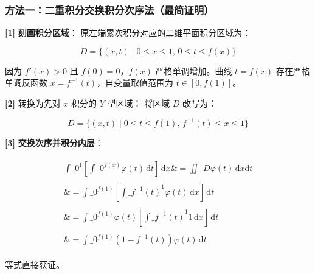 \documentclass[11pt,a4paper,UTF8]{ctexart}
\begin{document}
\subsubsection{方法一：二重积分交换积分次序法（最简证明）}
\begin{solbox}[分步推导与答题规范]
\textbf{[1]}  \textbf{刻画积分区域}：
原左端累次积分对应的二维平面积分区域为：

\begin{equation*}
D = \{(x, t) \mid 0 \le x \le 1,\, 0 \le t \le f(x)\}
\end{equation*}

因为 $f'(x) > 0$ 且 $f(0) = 0$，$f(x)$ 严格单调增加。曲线 $t = f(x)$ 存在严格单调反函数 $x = f^{-1}(t)$，自变量取值范围为 $t \in [0, f(1)]$。

\textbf{[2]}  \textit{}转换为先对 $x$ 积分的 $Y$ 型区域\textit{}：
将区域 $D$ 改写为：

\begin{equation*}
D = \{(x, t) \mid 0 \le t \le f(1),\, f^{-1}(t) \le x \le 1\}
\end{equation*}


\textbf{[3]}  \textbf{交换次序并积分内层}：

\begin{align*}
\begin{aligned}
\int\_0^1 \left[ \int\_0^{f(x)} \varphi(t)\,\mathrm{d}t \right]\,\mathrm{d}x \&= \iint\_D \varphi(t)\,\mathrm{d}x\mathrm{d}t \\ \\
\&= \int\_0^{f(1)} \left[ \int\_{f^{-1}(t)}^1 \varphi(t)\,\mathrm{d}x \right]\,\mathrm{d}t \\ \\
\&= \int\_0^{f(1)} \varphi(t) \left[ \int\_{f^{-1}(t)}^1 1\,\mathrm{d}x \right]\,\mathrm{d}t \\ \\
\&= \int\_0^{f(1)} (1 - f^{-1}(t))\varphi(t)\,\mathrm{d}t
\end{aligned}
\end{align*}

等式直接获证。
\end{solbox}
\end{document}
